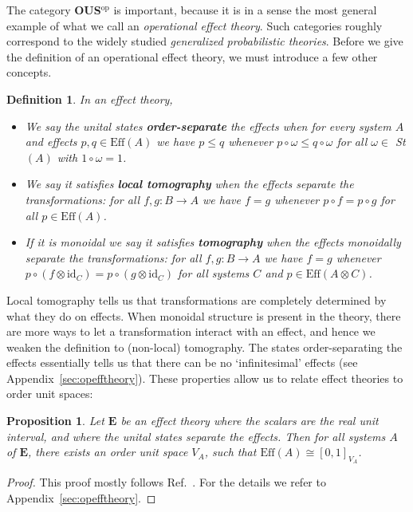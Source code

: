\documentclass[b5paper,onecolumn,12pt,accepted=2019-05-03, issue=1, volume=1, shorttitle=papers/compositionality-1-1]{compositionalityarticle}
\newcounter{counter}
\numberwithin{counter}{section}
\newtheorem{proposition}[counter]{Proposition}
\newtheorem{definition}[counter]{Definition}
\newcommand{\pred}{\text{Eff}}
\newcommand{\id}{\text{id}}
\newcommand{\opp}{\text{op}}
\begin{document}
The category \textbf{OUS}$^\opp$ is important, because it is in a sense the most general example of what we call an \emph{operational effect theory}. Such categories roughly correspond to the widely studied \emph{generalized probabilistic theories}. Before we give the definition of an operational effect theory, we must introduce a few other concepts.
\begin{definition}
    In an effect theory,
    \begin{itemize}
        \item We say the unital states \textbf{order-separate} the effects when for every system $A$ and effects $p,q\in \pred(A)$ we have $p\leq q$ whenever $ p\circ \omega \leq q\circ \omega $ for all $\omega\in $ St$(A)$ with $1\circ\omega = 1$.
        \item We say it satisfies \textbf{local tomography} when the effects separate the transformations: for all $f,g: B\rightarrow A$ we have $f=g$ whenever $p\circ f = p\circ g$ for all $p\in \pred(A)$.
        \item If it is monoidal we say it satisfies \textbf{tomography} when the effects monoidally separate the transformations: for all $f,g: B\rightarrow A$ we have $f=g$ whenever $p\circ (f\otimes \id_C) = p\circ (g\otimes \id_C)$ for all systems $C$ and $p\in \pred(A\otimes C)$.
    \end{itemize}
\end{definition}

\noindent Local tomography tells us that transformations are completely determined by what they do on effects. When monoidal structure is present in the theory, there are more ways to let a transformation interact with an effect, and hence we weaken the definition to (non-local) tomography.
The states order-separating the effects essentially tells us that there can be no `infinitesimal' effects (see Appendix~\ref{sec:opefftheory}). These properties allow us to relate effect theories to order unit spaces:

\begin{proposition}
    Let $\mathbf{E}$ be an effect theory where the scalars are the real unit interval, and where the unital states separate the effects. Then for all systems $A$ of $\mathbf{E}$, there exists an order unit space $V_A$, such that $\pred(A) \cong [0,1]_{V_A}$.
\end{proposition}
\begin{proof}
    This proof mostly follows Ref.~\cite{jacobs2016expectation}. For the details we refer to Appendix~\ref{sec:opefftheory}.
\end{proof}
\end{document}
